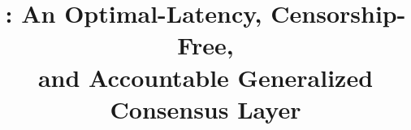 \title{
  \podtm: An Optimal-Latency, Censorship-Free, \\and Accountable Generalized Consensus Layer
}




